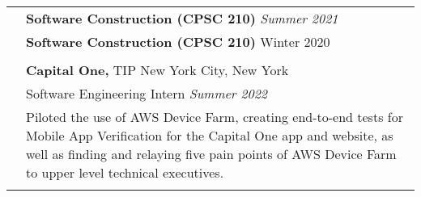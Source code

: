 \documentclass[letterpaper, 11pt]{article}
\begin{document}
\begin{longtable}{p{1.3in}p{4.8in}}
	 & \textbf{Software Construction (CPSC 210)} \hfill \textit{Summer 2021}                                                                                                                                                                                                                                                                                                                     \\

	 & \textbf{Software Construction (CPSC 210)} \hfill Winter 2020                                                                                                                                                                                                                                                                                                                              \\
	 &                                                                                                                                                                                                                                                                                                                                                                                           \\

	{\color{Blue}{Industry Experience}}
	 & {\textbf{Capital One,}} TIP \hfill New York City, New York                                                                                                                                                                                                                                                                                                                                \\
	 & Software Engineering Intern \hfill \textit{Summer 2022}                                                                                                                                                                                                                                                                                                                                   \\
	 & Piloted the use of AWS Device Farm, creating end-to-end tests for Mobile App Verification for the Capital One app and
	website, as well as finding and relaying five pain points of AWS Device Farm to upper level technical executives.                                                                                                                                                                                                                                                                            \\
	 &                                                                                                                                                                                                                                                                                                                                                                                           \\


\end{longtable}
\end{document}
